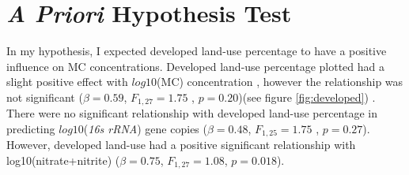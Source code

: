 


\section{\emph{A Priori} Hypothesis Test}

In my hypothesis, I expected developed land-use percentage to have a positive influence on MC concentrations. Developed land-use percentage plotted had a slight positive effect with $log10$(MC) concentration , however the relationship was not significant  ($\beta=0.59$, $F_{{1,27}}=1.75$ , $p=0.20$)(see figure \ref{fig:developed}) . There were no significant relationship with developed land-use percentage in predicting $log10$(\emph{16s rRNA}) gene copies ($\beta=0.48$, $F_{{1,25}}=1.75$ , $p=0.27$). However, developed land-use had a positive significant relationship with log10(nitrate+nitrite) ($\beta=0.75$, $F_{{1,27}}=1.08$, $p=0.018$).

